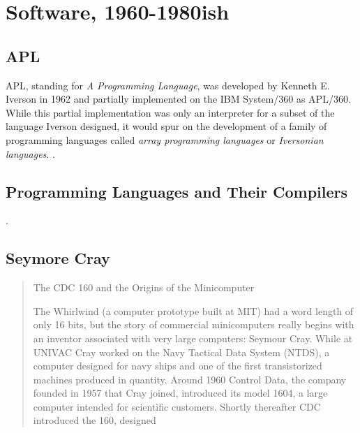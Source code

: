 
\chapter{Software, 1960-1980ish}
\label{chap:software}







\section{APL}

APL, standing for \textit{A Programming Language}, was developed by Kenneth E. Iverson in 1962
and partially implemented on the IBM System/360 as APL/360.
While this partial implementation was only an interpreter for a subset of the language Iverson
designed, it would spur on the development of a family of programming languages
called \textit{array programming languages} or \textit{Iversonian languages}.
.

\section{Programming Languages and Their Compilers}

.

\section{Seymore Cray}
\begin{quotation}
	The CDC 160 and the Origins of the Minicomputer

	The Whirlwind (a computer prototype built at
	MIT) had a word length of only 16 bits, but the story of commercial minicomputers really begins with
	an inventor associated with very large computers: Seymour Cray. While at UNIVAC Cray worked on the
	Navy Tactical Data System (NTDS), a computer designed for navy ships and one of the first
	transistorized machines produced in quantity. Around 1960 Control Data, the company founded in 1957
	that Cray joined, introduced its model 1604, a large computer intended for scientific customers.
	Shortly thereafter CDC introduced the 160, designed
	\cite{nothing_new_since_von_neumann_2000}
\end{quotation}

